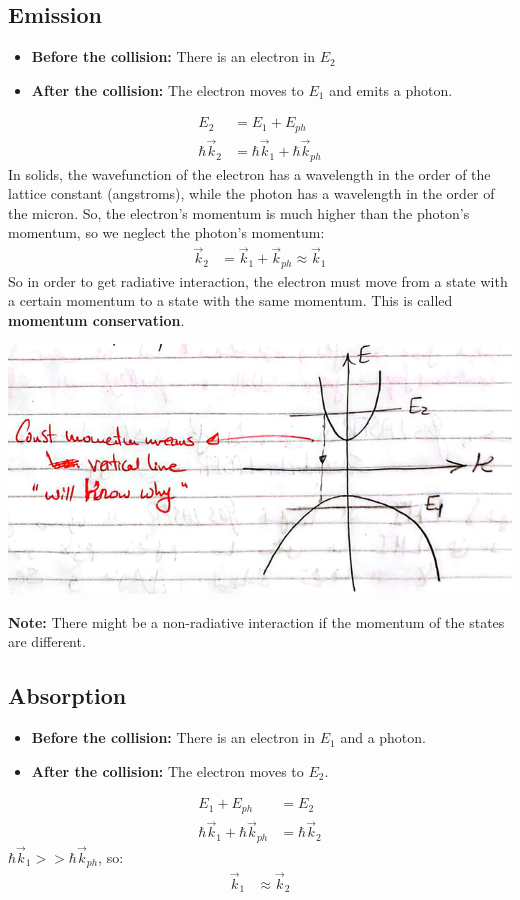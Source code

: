 \documentclass[11pt]{article}
\begin{document}
\subsection{Emission}
\begin{itemize}
    \item \textbf{Before the collision:} There is an electron in $E_2$
    \item \textbf{After the collision:} The electron moves to $E_1$ and emits a photon.
\end{itemize}
\begin{align*}
    E_2 &= E_1 + E_{ph} \\
    \hbar \vec{k}_2 &= \hbar \vec{k}_1 + \hbar \vec{k}_{ph}
\end{align*}
In solids, the wavefunction of the electron has a wavelength in the order of the lattice constant (angstroms),  while the photon has a wavelength in the order of the micron. So, the electron's momentum is much higher than the photon's momentum, so we neglect the photon's momentum:
\begin{align*}
    \vec{k}_2 &= \vec{k}_1 + \vec{k}_{ph} \approx \vec{k}_1
\end{align*}
So in order to get radiative interaction, the electron must move from a state with a certain momentum to a state with the same momentum. This is called \textbf{momentum conservation}.
\begin{center}
    \includegraphics[scale=0.7]{4.png}
\end{center}
\textbf{Note:} There might be a non-radiative interaction if the momentum of the states are different.

\subsection{Absorption}
\begin{itemize}
    \item \textbf{Before the collision:} There is an electron in $E_1$ and a photon.
    \item \textbf{After the collision:} The electron moves to $E_2$.
\end{itemize}
\begin{align*}
    E_1 + E_{ph} &= E_2 \\
    \hbar \vec{k}_1 + \hbar \vec{k}_{ph} &= \hbar \vec{k}_2
\end{align*}
$\hbar \vec{k}_1 >> \hbar \vec{k}_{ph}$, so:
\begin{align*}
    \vec{k}_1 &\approx \vec{k}_2
\end{align*}
\end{document}
